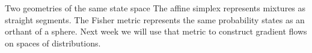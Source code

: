 \documentclass[aspectratio=169,11pt]{beamer}
\begin{document}
\begin{frame}{Two geometries of the same state space}
The affine simplex represents mixtures as straight segments.
\vspace{.48cm}
The Fisher metric represents the same probability states
as an orthant of a sphere.
\vspace{.48cm}
Next week we will use that metric to construct gradient flows
on spaces of distributions.
\end{frame}
\end{document}
